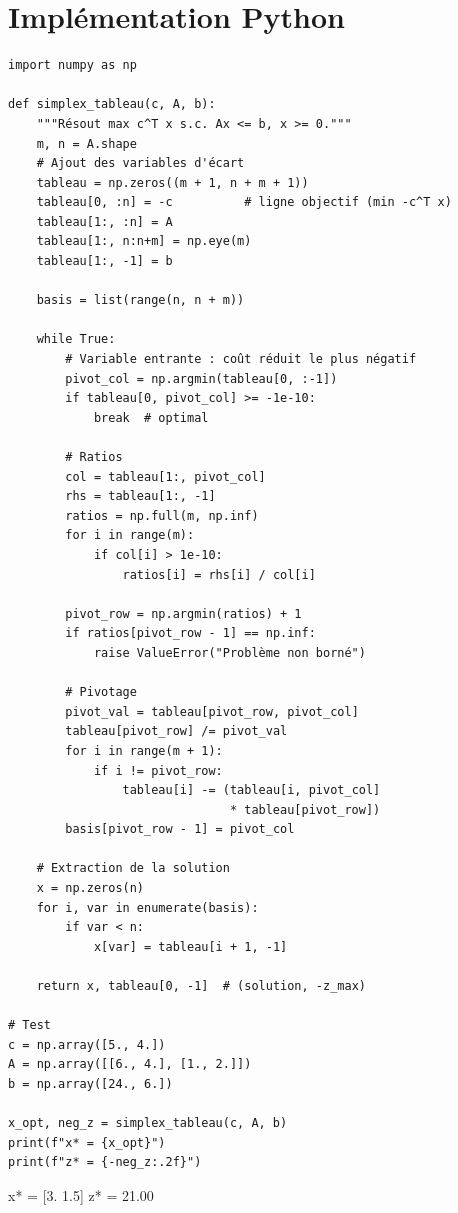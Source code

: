 \section{Impl\'ementation Python}

\begin{codeblock}[title=\textbf{Simplexe tabulaire en Python}]
\begin{verbatim}
import numpy as np

def simplex_tableau(c, A, b):
    """Résout max c^T x s.c. Ax <= b, x >= 0."""
    m, n = A.shape
    # Ajout des variables d'écart
    tableau = np.zeros((m + 1, n + m + 1))
    tableau[0, :n] = -c          # ligne objectif (min -c^T x)
    tableau[1:, :n] = A
    tableau[1:, n:n+m] = np.eye(m)
    tableau[1:, -1] = b

    basis = list(range(n, n + m))

    while True:
        # Variable entrante : coût réduit le plus négatif
        pivot_col = np.argmin(tableau[0, :-1])
        if tableau[0, pivot_col] >= -1e-10:
            break  # optimal

        # Ratios
        col = tableau[1:, pivot_col]
        rhs = tableau[1:, -1]
        ratios = np.full(m, np.inf)
        for i in range(m):
            if col[i] > 1e-10:
                ratios[i] = rhs[i] / col[i]

        pivot_row = np.argmin(ratios) + 1
        if ratios[pivot_row - 1] == np.inf:
            raise ValueError("Problème non borné")

        # Pivotage
        pivot_val = tableau[pivot_row, pivot_col]
        tableau[pivot_row] /= pivot_val
        for i in range(m + 1):
            if i != pivot_row:
                tableau[i] -= (tableau[i, pivot_col]
                               * tableau[pivot_row])
        basis[pivot_row - 1] = pivot_col

    # Extraction de la solution
    x = np.zeros(n)
    for i, var in enumerate(basis):
        if var < n:
            x[var] = tableau[i + 1, -1]

    return x, tableau[0, -1]  # (solution, -z_max)

# Test
c = np.array([5., 4.])
A = np.array([[6., 4.], [1., 2.]])
b = np.array([24., 6.])

x_opt, neg_z = simplex_tableau(c, A, b)
print(f"x* = {x_opt}")
print(f"z* = {-neg_z:.2f}")
\end{verbatim}
\end{codeblock}

\begin{codeoutput}
x* = [3.  1.5]
z* = 21.00
\end{codeoutput}


